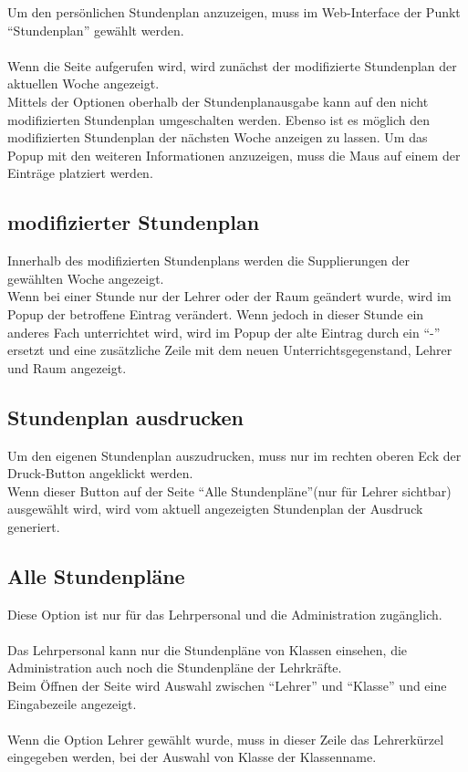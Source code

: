 Um den persönlichen Stundenplan anzuzeigen, muss im Web-Interface der Punkt \enquote{Stundenplan} gewählt werden. \\
\\
Wenn die Seite aufgerufen wird, wird zunächst der modifizierte Stundenplan der aktuellen Woche angezeigt.\\
Mittels der Optionen oberhalb der Stundenplanausgabe kann auf den nicht modifizierten Stundenplan umgeschalten werden. Ebenso ist es möglich den modifizierten Stundenplan der nächsten Woche anzeigen zu lassen.
Um das Popup mit den weiteren Informationen anzuzeigen, muss die Maus auf einem der Einträge platziert werden.
\subsection{modifizierter Stundenplan}
Innerhalb des modifizierten Stundenplans werden die Supplierungen der gewählten Woche angezeigt.\\
Wenn bei einer Stunde nur der Lehrer oder der Raum geändert wurde, wird im Popup der betroffene Eintrag verändert. Wenn jedoch in dieser Stunde ein anderes Fach unterrichtet wird, wird im Popup der alte Eintrag durch ein \enquote{-} ersetzt und eine zusätzliche Zeile mit dem neuen Unterrichtsgegenstand, Lehrer und Raum angezeigt.
\subsection{Stundenplan ausdrucken}
Um den eigenen Stundenplan auszudrucken, muss nur im rechten oberen Eck der Druck-Button angeklickt werden.\\
Wenn dieser Button auf der Seite \enquote{Alle Stundenpläne}(nur für Lehrer sichtbar) ausgewählt wird, wird vom aktuell angezeigten Stundenplan der Ausdruck generiert.
\subsection{Alle Stundenpläne}
Diese Option ist nur für das Lehrpersonal und die Administration zugänglich.\\\\
Das Lehrpersonal kann nur die Stundenpläne von Klassen einsehen, die Administration auch noch die Stundenpläne der Lehrkräfte.\\
Beim Öffnen der Seite wird Auswahl zwischen \enquote{Lehrer} und \enquote{Klasse} und eine Eingabezeile angezeigt.\\
\\
Wenn die Option Lehrer gewählt wurde, muss in dieser Zeile das Lehrerkürzel eingegeben werden, bei der Auswahl von Klasse der Klassenname.

